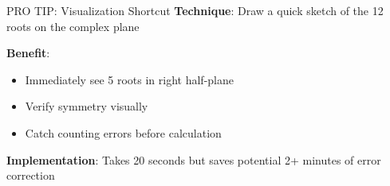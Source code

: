 \documentclass[11pt]{article}
\begin{document}
\begin{roadmapbox}
\begin{highlightbox}{PRO TIP: Visualization Shortcut}
\textbf{Technique}: Draw a quick sketch of the 12 roots on the complex plane

\textbf{Benefit}:
\begin{itemize}
    \item Immediately see 5 roots in right half-plane
    \item Verify symmetry visually
    \item Catch counting errors before calculation
\end{itemize}

\textbf{Implementation}: Takes 20 seconds but saves potential 2+ minutes of error correction
\end{highlightbox}

\end{roadmapbox}
\end{document}
